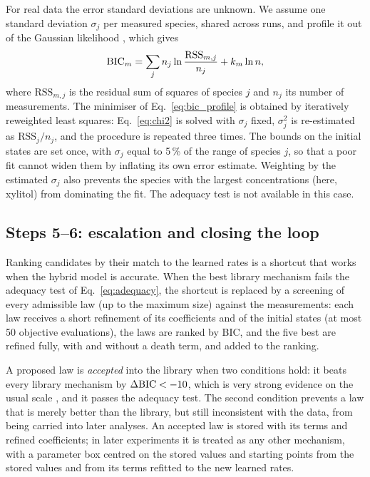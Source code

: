 For real data the error standard deviations are unknown. We assume one standard deviation $\sigma_j$ per measured species, shared across runs, and profile it out of the Gaussian likelihood \citep{BoxDraper1965,Bard1974}, which gives
\begin{equation}
\mathrm{BIC}_m = \sum_j n_j \ln\frac{\mathrm{RSS}_{m,j}}{n_j} + k_m \ln n ,
\label{eq:bic_profile}
\end{equation}
where $\mathrm{RSS}_{m,j}$ is the residual sum of squares of species $j$ and $n_j$ its number of measurements. The minimiser of Eq.~\eqref{eq:bic_profile} is obtained by iteratively reweighted least squares: Eq.~\eqref{eq:chi2} is solved with $\sigma_j$ fixed, $\sigma_j^2$ is re-estimated as $\mathrm{RSS}_{j}/n_j$, and the procedure is repeated three times. The bounds on the initial states are set once, with $\sigma_j$ equal to 5\,\% of the range of species $j$, so that a poor fit cannot widen them by inflating its own error estimate. Weighting by the estimated $\sigma_j$ also prevents the species with the largest concentrations (here, xylitol) from dominating the fit. The adequacy test is not available in this case.

\subsection{Steps 5--6: escalation and closing the loop}\label{sec:m:loop}
Ranking candidates by their match to the learned rates is a shortcut that works when the hybrid model is accurate. When the best library mechanism fails the adequacy test of Eq.~\eqref{eq:adequacy}, the shortcut is replaced by a screening of every admissible law (up to the maximum size) against the measurements: each law receives a short refinement of its coefficients and of the initial states (at most 50 objective evaluations), the laws are ranked by BIC, and the five best are refined fully, with and without a death term, and added to the ranking.

A proposed law is \emph{accepted} into the library when two conditions hold: it beats every library mechanism by $\Delta\mathrm{BIC}<-10$, which is very strong evidence on the usual scale \citep{Burnham2002}, and it passes the adequacy test. The second condition prevents a law that is merely better than the library, but still inconsistent with the data, from being carried into later analyses. An accepted law is stored with its terms and refined coefficients; in later experiments it is treated as any other mechanism, with a parameter box centred on the stored values and starting points from the stored values and from its terms refitted to the new learned rates.

